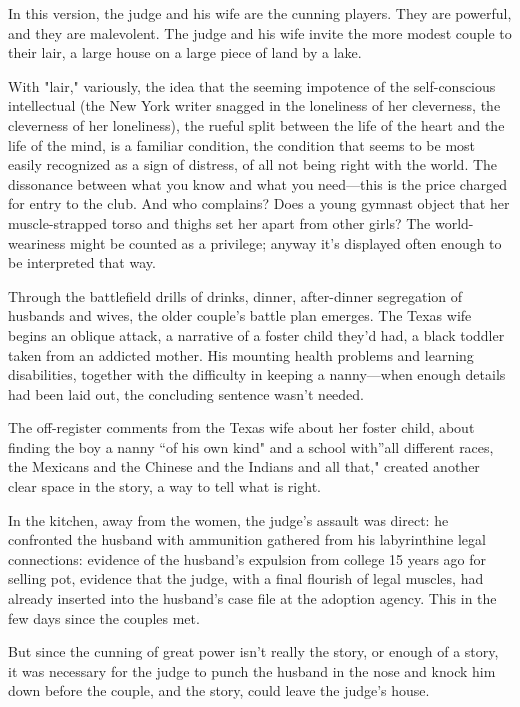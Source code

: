 \documentclass[
]{memoir}
\begin{document}
In this version, the judge and his wife are the cunning players. They
are powerful, and they are malevolent. The judge and his wife invite the
more modest couple to their lair, a large house on a large piece of land
by a lake.

With "lair," variously, the idea that the seeming impotence of the
self-conscious intellectual (the New York writer snagged in the
loneliness of her cleverness, the cleverness of her loneliness), the
rueful split between the life of the heart and the life of the mind, is
a familiar condition, the condition that seems to be most easily
recognized as a sign of distress, of all not being right with the world.
The dissonance between what you know and what you need---this is the
price charged for entry to the club. And who complains? Does a young
gymnast object that her muscle-strapped torso and thighs set her apart
from other girls? The world-weariness might be counted as a privilege;
anyway it's displayed often enough to be interpreted that way.

Through the battlefield drills of drinks, dinner, after-dinner
segregation of husbands and wives, the older couple's battle plan
emerges. The Texas wife begins an oblique attack, a narrative of a
foster child they'd had, a black toddler taken from an addicted mother.
His mounting health problems and learning disabilities, together with
the difficulty in keeping a nanny---when enough details had been laid
out, the concluding sentence wasn't needed.

The off-register comments from the Texas wife about her foster child,
about finding the boy a nanny ``of his own kind" and a school with''all
different races, the Mexicans and the Chinese and the Indians and all
that," created another clear space in the story, a way to tell what is
right.

In the kitchen, away from the women, the judge's assault was direct: he
confronted the husband with ammunition gathered from his labyrinthine
legal connections: evidence of the husband's expulsion from college 15
years ago for selling pot, evidence that the judge, with a final
flourish of legal muscles, had already inserted into the husband's case
file at the adoption agency. This in the few days since the couples met.

But since the cunning of great power isn't really the story, or enough
of a story, it was necessary for the judge to punch the husband in the
nose and knock him down before the couple, and the story, could leave
the judge's house.
\end{document}
